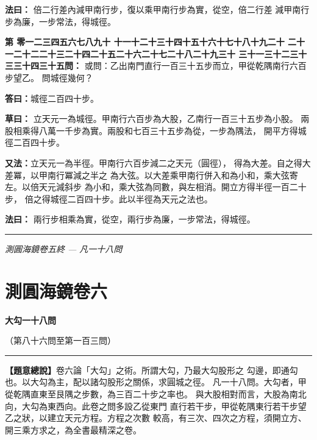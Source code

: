 \documentclass[11pt,a4paper]{article}
\newcommand{\longline}{\noindent\rule{\textwidth}{0.4pt}}
\newcounter{probnum}
\newcommand{\chnum}[1]{%
  \ifcase#1 零\or 一\or 二\or 三\or 四\or 五\or 六\or 七\or 八\or 九\or 十\or
    十一\or 十二\or 十三\or 十四\or 十五\or 十六\or 十七\or 十八\or 十九\or 二十\or
    二十一\or 二十二\or 二十三\or 二十四\or 二十五\or 二十六\or 二十七\or 二十八\or 二十九\or 三十\or
    三十一\or 三十二\or 三十三\or 三十四\or 三十五\fi}
\newcommand{\problem}[1]{\stepcounter{probnum}\par\noindent\textbf{第\chnum{\value{probnum}}問：}#1\par\vspace{0.2cm}}
\newcommand{\answer}[1]{\par\noindent\textbf{答曰：}#1\par\vspace{0.2cm}}
\newcommand{\working}[1]{\par\noindent\textbf{草曰：}#1\par\vspace{0.2cm}}
\newcommand{\method}[1]{\par\noindent\textbf{法曰：}#1\par\vspace{0.3cm}}
\newcommand{\tianyuan}[2]{\raisebox{-0.6ex}{\scriptsize$\begin{array}{c}#1\\\hline #2\end{array}$}}
\begin{document}
\method{
倍二行差內減甲南行步，復以乘甲南行步為實，從空，倍二行差
減甲南行步為廉，一步常法，得城徑。
}

\problem{
或問：乙出南門直行一百三十五步而立，甲從乾隅南行六百步望乙。
問城徑幾何？
}

\answer{城徑二百四十步。}

\working{
立天元一為城徑。甲南行六百步為大股，乙南行一百三十五步為小股。
兩股相乘得八萬一千步為實。兩股和七百三十五步為從，一步為隅法，
開平方得城徑二百四十步。

\textbf{又法：}立天元一為半徑。甲南行六百步減二之天元（圓徑），
得\tianyuan{600}{2}為大差。自之得大差冪，以甲南行冪減之半之
為大弦。以大差乘甲南行併入和為小和，乘大弦寄左。以倍天元減斜步
為小和，乘大弦為同數，與左相消。開立方得半徑一百二十步，
倍之得城徑二百四十步。此以半徑為天元之法也。
}

\method{
兩行步相乘為實，從空，兩行步為廉，一步常法，得城徑。
}

\vspace{0.5cm}
\longline
\begin{center}
\textit{測圓海鏡卷五終 --- 凡一十八問}
\end{center}

\newpage

\setcounter{probnum}{0}

\section{測圓海鏡卷六}
\label{sec:vol6}

\begin{center}
{\Large\bfseries\color{volcolor} 大勾一十八問}

\vspace{0.2cm}

{\small\color{notecolor} （第八十六問至第一百三問）}
\end{center}

\vspace{0.3cm}
\longline
\vspace{0.3cm}

\noindent
\textbf{【題意總說】}卷六論「大勾」之術。所謂大勾，乃最大勾股形之
勾邊，即通勾也。以大勾為主，配以諸勾股形之關係，求圓城之徑。
凡一十八問。大勾者，甲從乾隅直東至艮隅之步數，為三百二十步之率也。
與大股相對而言，大股為南北向，大勾為東西向。此卷之問多設乙從東門
直行若干步，甲從乾隅東行若干步望乙之狀，以建立天元方程。方程之次數
較高，有三次、四次之方程，須開立方、開三乘方求之，為全書最精深之卷。
\end{document}
